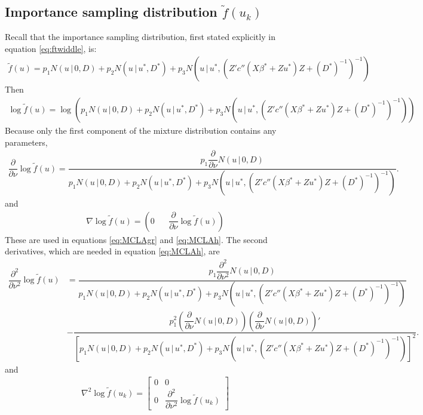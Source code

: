 \documentclass{article}
\begin{document}
\subsection{Importance sampling distribution $\tilde{f}(u_k)$}\label{sec:ftwiddle}
Recall that the importance sampling distribution, first stated explicitly in equation \ref{eq:ftwiddle}, is:
\begin{align}
 \tilde{f}(u) = p_1  N(u \, | \, 0, D)+p_2  N(u \, | \, u^*, D^*)+p_3  N(u \, | \, u^*, (Z'  c''(X \beta^*+Zu^*) Z +(D^*)^{-1}   )^{-1}) 
\end{align}
Then
\begin{align}
 \log \tilde{f}(u) = \log \left( p_1  N(u \, | \, 0, D)+p_2  N(u \, | \, u^*, D^*)+p_3  N(u \, | \, u^*, (Z'  c''(X \beta^*+Zu^*) Z +(D^*)^{-1}   )^{-1}) \right)
\end{align}
Because only the first component of the mixture distribution contains any parameters,
\begin{align}
\dfrac{\partial}{\partial \nu} \log \tilde{f}(u) = \dfrac{p_1  \dfrac{\partial}{\partial \nu} N(u \, | \, 0, D)}{ p_1  N(u \, | \, 0, D)+p_2  N(u \, | \, u^*, D^*)+p_3  N(u \, | \, u^*, (Z'  c''(X \beta^*+Zu^*) Z +(D^*)^{-1}   )^{-1})}.
\end{align}
and 
\begin{align}
\nabla  \log \tilde{f}(u) = \left(0   \; \; \; \; \; \; \dfrac{\partial}{\partial \nu} \log \tilde{f}(u) \right)
\end{align}
These are used in equations \ref{eq:MCLAgr} and \ref{eq:MCLAh}. The second derivatives, which are needed in equation \ref{eq:MCLAh}, are
\begin{align}
\dfrac{\partial^2}{\partial \nu^2} \log \tilde{f}(u) &= \dfrac{p_1  \dfrac{\partial^2}{\partial \nu^2} N(u \, | \, 0, D)}{ p_1  N(u \, | \, 0, D)+p_2  N(u \, | \, u^*, D^*)+p_3  N(u \, | \, u^*, (Z'  c''(X \beta^*+Zu^*) Z +(D^*)^{-1}   )^{-1})} \\ \nonumber
&- \dfrac{p_1^2 \left( \dfrac{\partial}{\partial \nu} N(u \, | \, 0, D)\right) \left( \dfrac{\partial}{\partial \nu} N(u \, | \, 0, D)\right)'}{\left[ p_1  N(u \, | \, 0, D)+p_2  N(u \, | \, u^*, D^*)+p_3  N(u \, | \, u^*, (Z'  c''(X \beta^*+Zu^*) Z +(D^*)^{-1}   )^{-1})\right]^2}.
\end{align}
and
\begin{align}
\nabla^2 \log \tilde{f}(u_k) = \begin{bmatrix} 0 & 0 \\ 0  & \dfrac{\partial^2}{ \partial \nu^2} \log \tilde{f} (u_k)  \end{bmatrix} 
\end{align}
\end{document}
